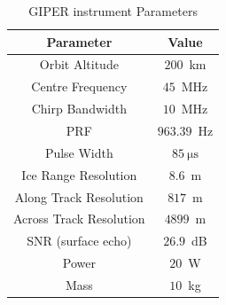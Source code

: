 \begin{table}[H]
\centering
\caption{\ac{GIPER} instrument Parameters }
\label{tab:parameter}
\begin{tabular}{|c|c|}
\hline 	\textbf{Parameter}		&  \textbf{Value}\\ 
\hline  Orbit Altitude			&  $200$~km	\\ 
\hline  Centre Frequency		&  $45$~MHz		\\ 
\hline  Chirp Bandwidth			&  $10$~MHz		\\
\hline  PRF						&  $963.39$~Hz	\\  
\hline  Pulse Width				&  $85 \mathrm{~\mu s}$		\\ 
\hline  Ice Range Resolution	&  $8.6$~m		\\
\hline  Along Track Resolution	&  $817$~m		\\ 
\hline  Across Track Resolution	&  $4899$~m		\\ 
\hline  SNR	(surface echo)		&  $26.9$~dB	\\ 
\hline  Power					&  $20$~W		\\ 
\hline  Mass					&  $10$~kg		\\ 
\hline 
\end{tabular} 
\end{table}

